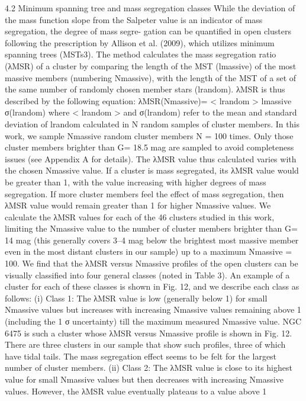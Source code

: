 \documentclass[../Main.tex]{subfiles}
\begin{document}
{4.2 Minimum spanning tree and mass segregation classes
While the deviation of the mass function slope from the Salpeter
value is an indicator of mass segregation, the degree of mass segre-
gation can be quantified in open clusters following the prescription
by Allison et al. (2009), which utilizes minimum spanning trees
(MSTs3). The method calculates the mass segregation ratio (λMSR)
of a cluster by comparing the length of the MST (lmassive) of the
most massive members (numbering Nmassive), with the length of the
MST of a set of the same number of randomly chosen member stars
(lrandom). λMSR is thus described by the following equation:
λMSR(Nmassive)=
< lrandom >
lmassive
σ(lrandom)
where < lrandom > and σ(lrandom) refer to the mean and standard
deviation of lrandom calculated in N random samples of cluster
members. In this work, we sample Nmassive random cluster members N
= 100 times. Only those cluster members brighter than G= 18.5 mag
are sampled to avoid completeness issues (see Appendix A for
details). The λMSR value thus calculated varies with the chosen
Nmassive value. If a cluster is mass segregated, its λMSR value would
be greater than 1, with the value increasing with higher degrees of
mass segregation. If more cluster members feel the effect of mass
segregation, then λMSR value would remain greater than 1 for higher
Nmassive values.
We calculate the λMSR values for each of the 46 clusters studied
in this work, limiting the Nmassive value to the number of cluster
members brighter than G= 14 mag (this generally covers 3–4 mag
below the brightest most massive member even in the most distant
clusters in our sample) up to a maximum Nmassive = 100. We find that
the λMSR versus Nmassive profiles of the open clusters can be visually
classified into four general classes (noted in Table 3). An example
of a cluster for each of these classes is shown in Fig. 12, and we
describe each class as follows:
(i) Class 1: The λMSR value is low (generally below 1) for small
Nmassive values but increases with increasing Nmassive values remaining
above 1 (including the 1 σ uncertainty) till the maximum measured
Nmassive value. NGC 6475 is such a cluster whose λMSR versus Nmassive
profile is shown in Fig. 12. There are three clusters in our sample
that show such profiles, three of which have tidal tails. The mass
segregation effect seems to be felt for the largest number of cluster
members.
(ii) Class 2: The λMSR value is close to its highest value for small
Nmassive values but then decreases with increasing Nmassive values.
However, the λMSR value eventually plateaus to a value above 1
}
\end{document}
